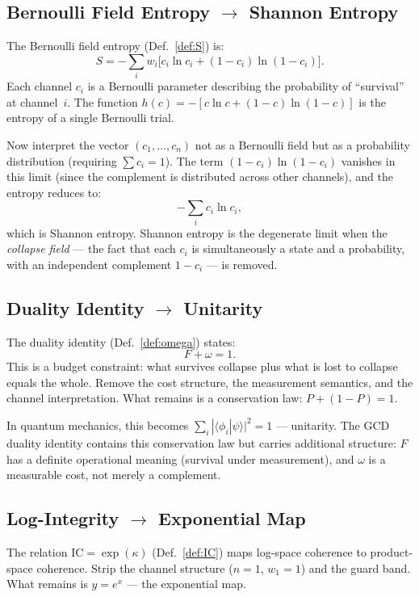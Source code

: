 \documentclass[
  aps,
  prd,
  preprint,
  superscriptaddress,
  nofootinbib,
  floatfix,
  longbibliography
]{revtex4-2}
\newcommand{\beq}{\begin{equation}}
\newcommand{\eeq}{\end{equation}}
\newcommand{\IC}{\mathrm{IC}}
\newcommand{\Fid}{F}
\newcommand{\Drft}{\omega}
\newcommand{\Ent}{S}
\newcommand{\Logint}{\kappa}
\begin{document}
\subsection{Bernoulli Field Entropy $\to$ Shannon Entropy}

The Bernoulli field entropy (Def.~\ref{def:S}) is:
\beq
  \Ent = -\sum_{i} w_i
    \bigl[c_i \ln c_i + (1-c_i)\ln(1-c_i)\bigr].
\eeq
Each channel $c_i$ is a Bernoulli parameter describing
the probability of ``survival'' at channel~$i$.
The function $h(c) = -[c\ln c + (1-c)\ln(1-c)]$
is the entropy of a single Bernoulli trial.

Now interpret the vector $(c_1, \ldots, c_n)$ not as
a Bernoulli field but as a probability distribution
(requiring $\sum c_i = 1$).
The term $(1-c_i)\ln(1-c_i)$ vanishes in this limit
(since the complement is distributed across other
channels), and the entropy reduces to:
\beq
  -\sum_{i} c_i \ln c_i,
\eeq
which is Shannon entropy.
Shannon entropy is the degenerate limit when the
\emph{collapse field} — the fact that each $c_i$ is
simultaneously a state and a probability, with an
independent complement $1 - c_i$ — is removed.

\subsection{Duality Identity $\to$ Unitarity}

The duality identity (Def.~\ref{def:omega}) states:
\beq
  \Fid + \Drft = 1.
\eeq
This is a budget constraint: what survives collapse
plus what is lost to collapse equals the whole.
Remove the cost structure, the measurement semantics,
and the channel interpretation.
What remains is a conservation law: $P + (1-P) = 1$.

In quantum mechanics, this becomes
$\sum_i |\langle \phi_i|\psi\rangle|^2 = 1$ —
unitarity.
The GCD duality identity contains this conservation
law but carries additional structure: $\Fid$ has a
definite operational meaning (survival under measurement),
and $\Drft$ is a measurable cost, not merely
a complement.

\subsection{Log-Integrity $\to$ Exponential Map}

The relation $\IC = \exp(\Logint)$ (Def.~\ref{def:IC})
maps log-space coherence to product-space coherence.
Strip the channel structure ($n = 1$, $w_1 = 1$) and
the guard band.
What remains is $y = e^x$ — the exponential map.
\end{document}
